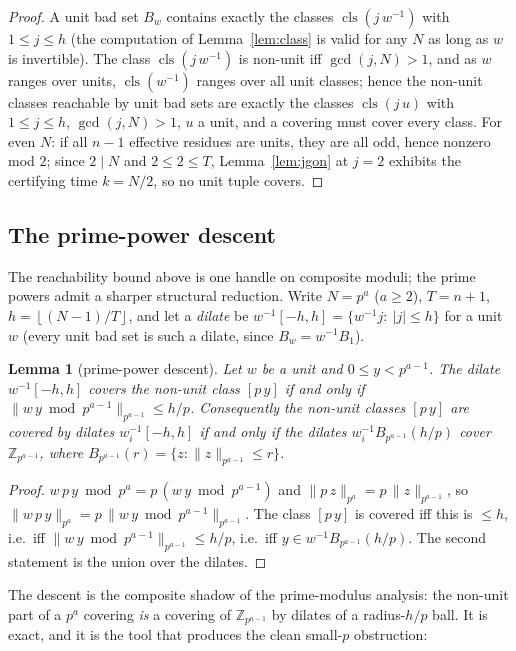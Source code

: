 \documentclass[11pt,a4paper]{article}
\numberwithin{equation}{section}
\theoremstyle{plain}
\theoremstyle{plain}
\newtheorem{lemma}[theorem]{Lemma}
\theoremstyle{definition}
\theoremstyle{remark}
\newcommand{\Z}{\mathbb{Z}}
\newcommand{\floor}[1]{\left\lfloor #1 \right\rfloor}
\DeclareMathOperator{\cls}{cls}
\begin{document}
\begin{proof}
A unit bad set $B_w$ contains exactly the classes $\cls(j\,w^{-1})$ with
$1\le j\le h$ (the computation of Lemma~\ref{lem:class} is valid for any
$N$ as long as $w$ is invertible). The class $\cls(j\,w^{-1})$ is
non-unit iff $\gcd(j,N)>1$, and as $w$ ranges over units, $\cls(w^{-1})$
ranges over all unit classes; hence the non-unit classes reachable by unit
bad sets are exactly the classes $\cls(j\,u)$ with $1\le j\le h$,
$\gcd(j,N)>1$, $u$ a unit, and a covering must cover every class. For
even $N$: if all $n-1$ effective residues are units, they are all odd,
hence nonzero mod $2$; since $2\mid N$ and $2\le 2\le T$,
Lemma~\ref{lem:jgon} at $j=2$ exhibits the certifying time $k=N/2$, so
no unit tuple covers.
\end{proof}

\subsection{The prime-power descent}\label{sec:pq-descent}

The reachability bound above is one handle on composite moduli; the
prime powers admit a sharper structural reduction. Write $N=p^a$
($a\ge 2$), $T=n+1$, $h=\floor{(N-1)/T}$, and let a \emph{dilate} be
$w^{-1}[-h,h]=\{w^{-1}j:\ |j|\le h\}$ for a unit $w$ (every unit bad set
is such a dilate, since $B_w=w^{-1}B_1$).

\begin{lemma}[prime-power descent]\label{lem:pq-descent}
Let $w$ be a unit and $0\le y<p^{a-1}$. The dilate $w^{-1}[-h,h]$ covers
the non-unit class $[p\,y]$ if and only if
$\lVert w\,y\bmod p^{a-1}\rVert_{p^{a-1}}\le h/p$. Consequently the
non-unit classes $[p\,y]$ are covered by dilates $w_i^{-1}[-h,h]$ if and
only if the dilates $w_i^{-1}B_{p^{a-1}}(h/p)$ cover $\Z_{p^{a-1}}$,
where $B_{p^{a-1}}(r)=\{z:\lVert z\rVert_{p^{a-1}}\le r\}$.
\end{lemma}

\begin{proof}
$w\,p\,y\bmod p^a=p\,(w\,y\bmod p^{a-1})$ and
$\lVert p\,z\rVert_{p^a}=p\,\lVert z\rVert_{p^{a-1}}$, so
$\lVert w\,p\,y\rVert_{p^a}=p\,\lVert w\,y\bmod p^{a-1}\rVert_{p^{a-1}}$.
The class $[p\,y]$ is covered iff this is $\le h$, i.e.\ iff
$\lVert w\,y\bmod p^{a-1}\rVert_{p^{a-1}}\le h/p$, i.e.\ iff
$y\in w^{-1}B_{p^{a-1}}(h/p)$. The second statement is the union over the
dilates.
\end{proof}

The descent is the composite shadow of the prime-modulus analysis: the
non-unit part of a $p^a$ covering \emph{is} a covering of $\Z_{p^{a-1}}$
by dilates of a radius-$h/p$ ball. It is exact, and it is the tool that
produces the clean small-$p$ obstruction:
\end{document}
